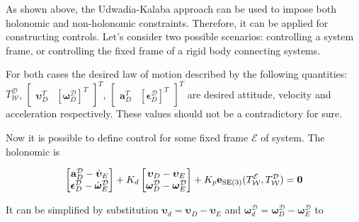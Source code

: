 As shown above, the Udwadia-Kalaba approach can be used to impose both holonomic and 
non-holonomic constraints. Therefore, it can be applied for constructing controls. 
Let's consider two possible scenarios: controlling a system frame, or controlling the 
fixed frame of a rigid body connecting systems.

For both cases the desired law of motion described by the following quantities: 
$T_{\mathcal{W}}^{\mathcal{D}}$, $\begin{bmatrix} \boldsymbol{\upsilon}_D^T & 
[\boldsymbol{\omega}_D^{\mathcal{D}}]^T \end{bmatrix}^T$, $\begin{bmatrix} 
\mathbf{a}_D^T & [\boldsymbol{\epsilon}_D^{\mathcal{D}}]^T \end{bmatrix}^T$ are 
desired attitude, velocity and acceleration respectively. These values should not be 
a contradictory for sure. 

Now it is possible to define control for some fixed frame $\mathcal{E}$ of system. 
The holonomic is 

\begin{equation}
    \begin{bmatrix}
        \mathbf{a}_D^{\mathcal{D}} - \dot{\boldsymbol{\upsilon}}_E \\
        \boldsymbol{\epsilon}_D^{\mathcal{D}} - 
        \dot{\boldsymbol{\omega}}_E^{\mathcal{D}}
    \end{bmatrix}
    + K_d
    \begin{bmatrix}
        \boldsymbol{\upsilon}_D  - \boldsymbol{\upsilon}_E \\
        \boldsymbol{\omega}_D^{\mathcal{D}} - 
        \boldsymbol{\omega}_E^{\mathcal{D}}
    \end{bmatrix}
    + K_p
    \mathbf{e}_{\text{SE}(3)}(T_{\mathcal{W}}^{\mathcal{E}}, T_{\mathcal{W}}^{\mathcal{D}})
    = \mathbf{0}
    \label{eqn:control_e_const}
\end{equation}

It can be simplified by substitution $\boldsymbol{\upsilon}_d = 
\boldsymbol{\upsilon}_D  - \boldsymbol{\upsilon}_E$ and 
$\boldsymbol{\omega}_d^{\mathcal{D}} = \boldsymbol{\omega}_D^{\mathcal{D}} - 
\boldsymbol{\omega}_E^{\mathcal{D}}$ to 

